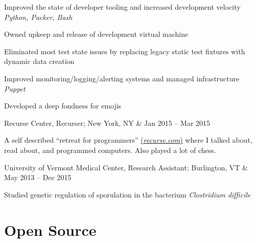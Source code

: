 \documentclass[letterpaper]{scrartcl}
\begin{document}
\begin{list1}
\begin{list2}
  \item Improved the state of developer tooling and increased development velocity \hfill \emph{Python, Packer, Bash}

    \begin{list3}
    \item Owned upkeep and release of development virtual machine
    \item Eliminated most test state issues by replacing legacy static test fixtures with dynamic data creation
    \end{list3}

  \item Improved monitoring/logging/alerting systems and managed infrastructure \hfill \emph{Puppet}
  \item Developed a deep fondness for emojis
  \end{list2}

\item \begin{tabular1bold} Recurse Center, Recurser; New York, NY &  Jan 2015 -- Mar 2015 \end{tabular1bold}

  \begin{list2}
  \item A self described ``retreat for programmers'' \href{recurse.com}{(\emph{recurse.com})} where I talked about, read about, and programmed computers. Also played a lot of chess.
  \end{list2}

\item \begin{tabular1bold} University of Vermont Medical Center, Research Assistant; Burlington, VT & May 2013 -- Dec 2015 \end{tabular1bold}

  \begin{list2}
  \item Studied genetic regulation of sporulation in the bacterium \emph{Clostridium difficile}
  \end{list2}

\end{list1}

%
%

\section*{Open Source}
\end{document}
